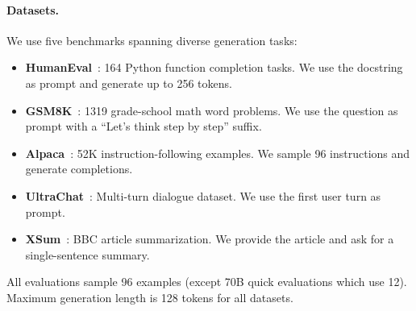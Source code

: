 \paragraph{Datasets.}
We use five benchmarks spanning diverse generation tasks:
\begin{itemize}
  \item \textbf{HumanEval}~\citep{chen2021codex}: 164 Python function completion tasks. We use the docstring as prompt and generate up to 256 tokens.
  \item \textbf{GSM8K}~\citep{cobbe2021gsm8k}: 1319 grade-school math word problems. We use the question as prompt with a ``Let's think step by step'' suffix.
  \item \textbf{Alpaca}~\citep{taori2023alpaca}: 52K instruction-following examples. We sample 96 instructions and generate completions.
  \item \textbf{UltraChat}~\citep{ding2023ultrachat}: Multi-turn dialogue dataset. We use the first user turn as prompt.
  \item \textbf{XSum}~\citep{narayan2018xsum}: BBC article summarization. We provide the article and ask for a single-sentence summary.
\end{itemize}
All evaluations sample 96 examples (except 70B quick evaluations which use 12).
Maximum generation length is 128 tokens for all datasets.
